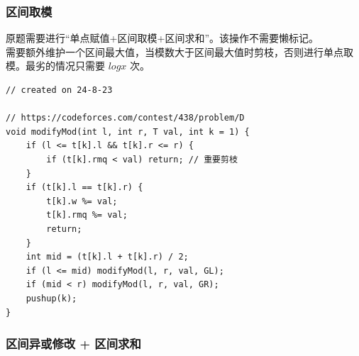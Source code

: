 \documentclass[a4paper,12pt]{article}
\begin{document}
\subsubsection{区间取模}

\noindent 原题需要进行“单点赋值+区间取模+区间求和”。该操作不需要懒标记。
\\

\noindent 需要额外维护一个区间最大值，当模数大于区间最大值时剪枝，否则进行单点取模。最劣的情况只需要 \(log x\) 次。

\begin{lstlisting}
// created on 24-8-23

// https://codeforces.com/contest/438/problem/D
void modifyMod(int l, int r, T val, int k = 1) {
    if (l <= t[k].l && t[k].r <= r) {
        if (t[k].rmq < val) return; // 重要剪枝
    }
    if (t[k].l == t[k].r) {
        t[k].w %= val;
        t[k].rmq %= val;
        return;
    }
    int mid = (t[k].l + t[k].r) / 2;
    if (l <= mid) modifyMod(l, r, val, GL);
    if (mid < r) modifyMod(l, r, val, GR);
    pushup(k);
}   
\end{lstlisting}

\subsubsection{区间异或修改 + 区间求和}
\end{document}

